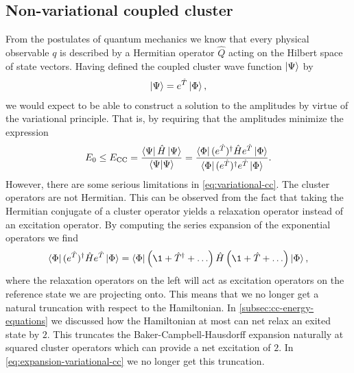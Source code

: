         \subsection{Non-variational coupled cluster}
            From the postulates of quantum mechanics we know that every physical
            observable $q$ is described by a Hermitian operator $\hat{Q}$ acting
            on the Hilbert space of state vectors.
            Having defined the coupled cluster wave function $\ket{\Psi}$ by
            \begin{align}
                \ket{\Psi} = e^{\hat{T}}\ket{\Phi},
            \end{align}
            we would expect to be able to construct a solution to the amplitudes
            by virtue of the variational principle.
            That is, by requiring that the amplitudes minimize the expression
            \begin{align}
                E_0
                \leq E_{\text{CC}}
                = \frac{\bra{\Psi}\hat{H}\ket{\Psi}}{\braket{\Psi}{\Psi}}
                = \frac{
                    \bra{\Phi} (e^{\hat{T}})^{\dagger}\hat{H} e^{\hat{T}}\ket{\Phi}
                }{
                    \bra{\Phi} (e^{\hat{T}})^{\dagger} e^{\hat{T}}\ket{\Phi}
                }.
                \label{eq:variational-cc}
            \end{align}
            However, there are some serious limitations in
            \autoref{eq:variational-cc}.
            The cluster operators are not Hermitian.
            This can be observed from the fact that taking the Hermitian
            conjugate of a cluster operator yields a relaxation operator instead
            of an excitation operator.
            By computing the series expansion of the exponential operators we
            find
            \begin{align}
                \braslat (e^{\clust})^{\dagger}\hamil e^{\clust}\ketslat
                = \braslat\para{
                    \1 + \clust^{\dagger} + \dots
                }
                \hamil
                \para{
                    \1 + \clust + \dots
                }
                \ketslat,
                \label{eq:expansion-variational-cc}
            \end{align}
            where the relaxation operators on the left will act as excitation
            operators on the reference state we are projecting onto.
            This means that we no longer get a natural truncation with respect
            to the Hamiltonian.
            In \autoref{subsec:cc-energy-equations} we discussed how the
            Hamiltonian at most can net relax an exited state by $2$.
            This truncates the Baker-Campbell-Hausdorff expansion naturally at
            squared cluster operators which can provide a net excitation of $2$.
            In \autoref{eq:expansion-variational-cc} we no longer get this
            truncation.

